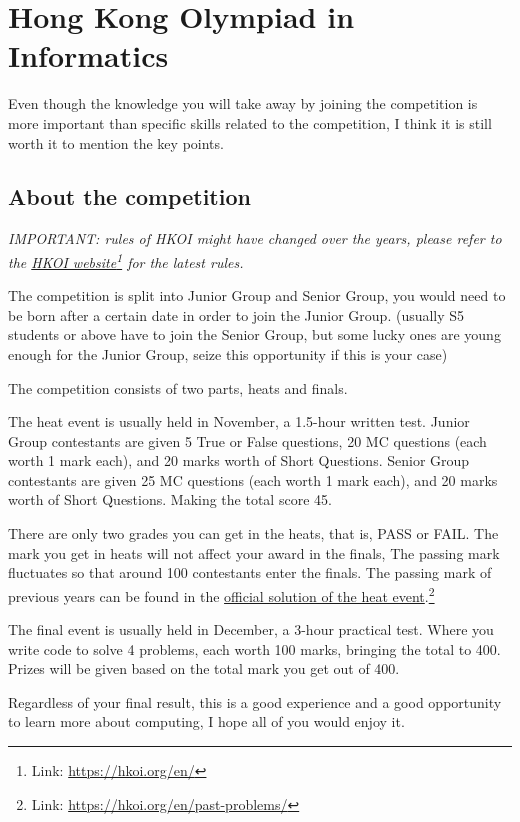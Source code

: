 \chapter{Hong Kong Olympiad in Informatics}
Even though the knowledge you will take away by joining the competition is more important than specific skills related to the competition, I think it is still worth it to mention the key points.

\section{About the competition}
\textit{IMPORTANT: rules of HKOI might have changed over the years, please refer to the \href{https://hkoi.org/en/}{HKOI website}\footnote{Link: \url{https://hkoi.org/en/}} for the latest rules.}

The competition is split into Junior Group and Senior Group, you would need to be born after a certain date in order to join the Junior Group. (usually S5 students or above have to join the Senior Group, but some lucky ones are young enough for the Junior Group, seize this opportunity if this is your case)

The competition consists of two parts, heats and finals.

The heat event is usually held in November, a 1.5-hour written test. Junior Group contestants are given 5 True or False questions, 20 MC questions (each worth 1 mark each), and 20 marks worth of Short Questions. Senior Group contestants are given 25 MC questions (each worth 1 mark each), and 20 marks worth of Short Questions. Making the total score 45. 

There are only two grades you can get in the heats, that is, PASS or FAIL. The mark you get in heats will not affect your award in the finals, The passing mark fluctuates so that around 100 contestants enter the finals. The passing mark of previous years can be found in the \href{https://hkoi.org/en/past-problems/}{official solution of the heat event}.\footnote{Link: \url{https://hkoi.org/en/past-problems/}}

The final event is usually held in December, a 3-hour practical test. Where you write code to solve 4 problems, each worth 100 marks, bringing the total to 400. Prizes will be given based on the total mark you get out of 400.

Regardless of your final result, this is a good experience and a good opportunity to learn more about computing, I hope all of you would enjoy it.

